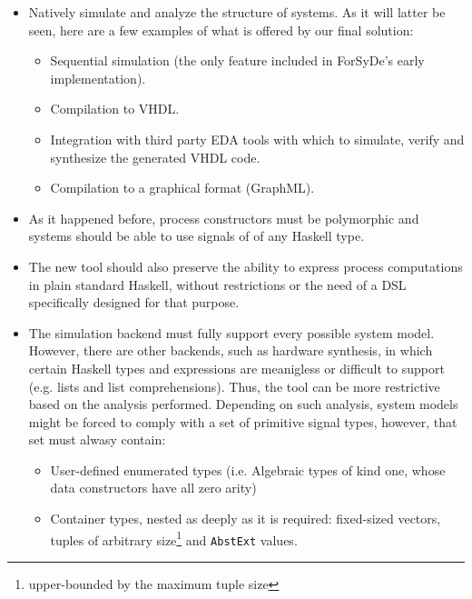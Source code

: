 \begin{itemize}
\item Natively simulate and analyze the structure of systems. As it
  will latter be seen, here are a few examples of what is offered by
  our final solution:
  \begin{itemize}
    \item Sequential simulation (the only feature included in
      ForSyDe's early implementation).
    \item Compilation to VHDL.
    \item Integration with third party EDA tools with which to
      simulate, verify and synthesize the generated VHDL code.
    \item Compilation to a graphical format (GraphML).
  \end{itemize}
\item As it happened before, process constructors must be
  polymorphic and systems should be able to use signals of
  of any Haskell type.
\item The new tool should also preserve the ability to express 
  process computations in plain standard Haskell, without
  restrictions or the need of a DSL specifically designed for that purpose.
\item The simulation backend must fully support every possible system
  model. However, there are other backends, such as hardware
  synthesis, in which certain Haskell types and expressions are
  meanigless or difficult to support (e.g. lists and list
  comprehensions). Thus, the tool can be more restrictive based on the
  analysis performed. Depending on such analysis, system models might
  be forced to comply with a set of primitive signal types, however, that
  set must alwasy contain:
  \begin{itemize}
  \item User-defined enumerated types
    (i.e. Algebraic types of kind one, whose data constructors have all
    zero arity)
  \item Container types, nested as deeply as it is
    required: fixed-sized vectors, tuples of arbitrary
    size\footnote{upper-bounded by the maximum tuple size} and
    \texttt{AbstExt} values.
  \end{itemize}
  

\end{itemize}
